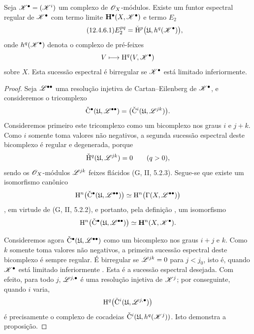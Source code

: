 \begin{proposition}[12.4.6]
\label{0.12.4.6}
Seja $\mathscr{K}^\bullet=(\mathscr{K}^i)$ um complexo de
$\mathscr{O}_X$-módulos.
Existe um funtor espectral regular de $\mathscr{K}^\bullet$ com
termo limite $\mathbf{H}^\bullet(X,\mathscr{K}^\bullet)$ e termo $E_2$
\begin{equation}
\label{0.12.4.6.1}
\tag{12.4.6.1}
  E_2^{pq}
  =
  \CHH^p\bigl(\mathfrak{U},h^q(\sh{K}^\bullet)\bigr),
\end{equation}
onde $h^q(\mathscr{K}^\bullet)$ denota o complexo de pré-feixes
\[
  V\longmapsto\mathrm{H}^q(V,\mathscr{K}^\bullet)
\]
sobre $X$.
Esta sucessão espectral é birregular se $\mathscr{K}^\bullet$ está limitado
inferiormente.
\end{proposition}

\begin{proof}
Seja $\mathscr{L}^{\bullet\bullet}$ uma resolução injetiva de
Cartan--Eilenberg de $\mathscr{K}^\bullet$, e consideremos o tricomplexo
\[
  \check{\mathrm{C}}^\bullet
  (\mathfrak{U},\mathscr{L}^{\bullet\bullet})
  =
  \bigl(\check{\mathrm{C}}^i
    (\mathfrak{U},\mathscr{L}^{jk})\bigr).
\]
Consideremos primeiro este tricomplexo como um bicomplexo nos graus $i$ e
$j+k$.
Como $i$ somente toma valores não negativos, a segunda sucessão espectral
deste bicomplexo é regular  e degenerada, porque
\[
  \check{\mathrm{H}}^q(\mathfrak{U},\mathscr{L}^{jk})=0
  \qquad(q>0),
\]
sendo os $\mathscr{O}_X$-módulos $\mathscr{L}^{jk}$ feixes flácidos
(G, II, 5.2.3).
Segue-se que existe um isomorfismo canônico
\[
  \mathrm{H}^n\bigl(
    \check{\mathrm{C}}^\bullet
      (\mathfrak{U},\mathscr{L}^{\bullet\bullet})
  \bigr)
  \simeq
  \mathrm{H}^n\bigl(\Gamma(X,\mathscr{L}^{\bullet\bullet})\bigr)
\]
, em virtude de (G, II, 5.2.2), e portanto, pela
definição , um isomorfismo
\[
  \mathrm{H}^n\bigl(
    \check{\mathrm{C}}^\bullet
      (\mathfrak{U},\mathscr{L}^{\bullet\bullet})
  \bigr)
  \simeq
  \mathbf{H}^n(X,\mathscr{K}^\bullet).
\]

Consideremos agora
$\check{\mathrm{C}}^\bullet
(\mathfrak{U},\mathscr{L}^{\bullet\bullet})$
como um bicomplexo nos graus $i+j$ e $k$.
Como $k$ somente toma valores não negativos, a primeira sucessão espectral
deste bicomplexo é sempre regular.
É birregular se $\mathscr{L}^{jk}=0$ para $j<j_0$, isto é, quando
$\mathscr{K}^\bullet$ está limitado inferiormente .
Esta é a sucessão espectral desejada.
Com efeito, para todo $j$, $\mathscr{L}^{j,\bullet}$ é uma resolução
injetiva de $\mathscr{K}^j$; por conseguinte, quando $i$ varia,
\[
  \mathrm{H}^q\bigl(
    \check{\mathrm{C}}^i
      (\mathfrak{U},\mathscr{L}^{j,\bullet})
  \bigr)
\]
é precisamente o complexo de cocadeias
$\check{\mathrm{C}}^i(\mathfrak{U},h^q(\mathscr{K}^j))$.
Isto demonstra a proposição.
\end{proof}

